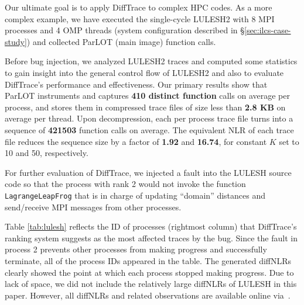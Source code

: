 

Our ultimate goal is to apply DiffTrace to complex HPC codes.
%
As a more complex example, we have executed the single-cycle LULESH2\cite{LULESH2:changes} with 8 MPI processes
and 4 OMP threads (system configuration described in \S\ref{sec:ilcs-case-study})
and collected ParLOT (main image) function calls.


Before bug injection, we analyzed LULESH2 traces and computed some statistics to gain insight into the
general control flow of LULESH2 and also to evaluate DiffTrace's
performance and effectiveness.
%
Our primary results show that ParLOT instruments and captures \textbf{410 distinct function} calls on
average per process, and stores them in compressed trace files of size less than \textbf{2.8 KB}
on average per thread.
%
Upon decompression, each per process trace file
turns into a sequence of \textbf{421503} function calls on average. The equivalent NLR of each trace file reduces the sequence size by a factor of \textbf{1.92} and \textbf{16.74}, for constant $K$ set to 10 and 50, respectively.
%
%
%
%
%


For further evaluation of DiffTrace, we injected a fault into the LULESH source code so that the process with rank 2
would not invoke the function \texttt{LagrangeLeapFrog} that is in charge of updating ``domain'' distances and send/receive
MPI messages from other processes.
%

%
Table \ref{tab:lulesh} reflects the ID of processes (rightmost column)
that DiffTrace's ranking system suggests as the most affected traces by the bug.
%
Since the fault in process 2 prevents other processes from making progress and successfully terminate,
all of the process IDs appeared in the table.
The generated diffNLRs clearly showed the point at which each process stopped making progress.
%
Due to lack of space, we did not include the relatively large diffNLRs of LULESH in this paper.
However, all diffNLRs and related observations are available online via~\cite{diffTraceMaterials}.


